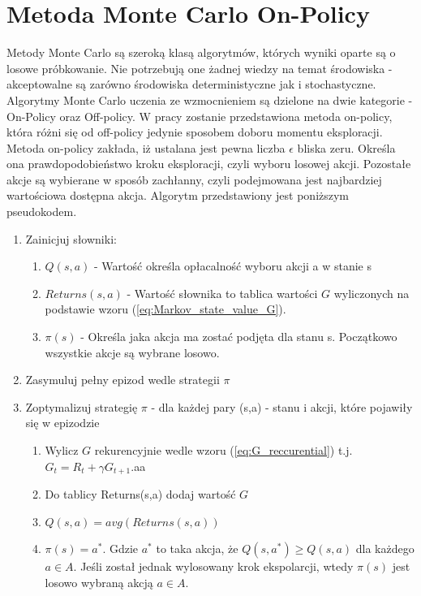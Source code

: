 \documentclass[12pt]{book}
\theoremstyle{plain}
\begin{document}
\section{Metoda Monte Carlo On-Policy}
Metody Monte Carlo są szeroką klasą algorytmów, których wyniki oparte są o losowe próbkowanie. Nie potrzebują one żadnej wiedzy na temat środowiska - akceptowalne są zarówno środowiska deterministyczne jak i stochastyczne. Algorytmy Monte Carlo uczenia ze wzmocnieniem są dzielone na dwie kategorie - On-Policy oraz Off-policy. W pracy zostanie przedstawiona metoda on-policy, która różni się od off-policy jedynie sposobem doboru momentu eksploracji. Metoda on-policy zakłada, iż ustalana jest pewna liczba $\epsilon$ bliska zeru. Określa ona prawdopodobieństwo kroku eksploracji, czyli wyboru losowej akcji. Pozostałe akcje są wybierane w sposób zachłanny, czyli podejmowana jest najbardziej wartościowa dostępna akcja. Algorytm przedstawiony jest poniższym pseudokodem.
\begin{enumerate}
	\item Zainicjuj słowniki:
	\begin{enumerate}
		\item $Q(s,a)$ - Wartość określa opłacalność wyboru akcji a w stanie s
		\item $Returns(s,a)$ - Wartość słownika to tablica wartości $G$ wyliczonych na podstawie wzoru (\ref{eq:Markov_state_value_G}).
		\item $\pi(s)$ - Określa jaka akcja ma zostać podjęta dla stanu s. Początkowo wszystkie akcje są wybrane losowo.
	\end{enumerate}
	\item Zasymuluj pełny epizod wedle strategii $\pi$
	\item Zoptymalizuj strategię $\pi$ - dla każdej pary (s,a) - stanu i akcji, które pojawiły się w epizodzie
	\begin{enumerate}
		\item Wylicz $G$ rekurencyjnie wedle wzoru (\ref{eq:G_reccurential}) t.j. $G_{t}=R_{t}+\gamma G_{t+1}$.aa
		\item Do tablicy Returns(s,a) dodaj wartość $G$
		\item $Q(s,a)=avg(Returns(s,a))$
		\item $\pi(s)=a^*$. Gdzie $a^*$ to taka akcja, że $Q(s,a^*)\geq Q(s,a)$ dla każdego $a 
		\in A$. Jeśli został jednak wylosowany krok ekspolarcji, wtedy $\pi(s)$ jest losowo wybraną akcją $a \in A$.
	\end{enumerate}
\end{enumerate}
\end{document}
